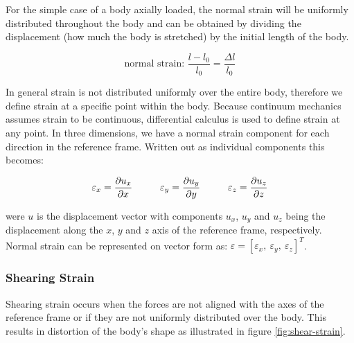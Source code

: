 For the simple case of a body axially loaded,
the normal strain will be uniformly distributed throughout the body
and can be obtained by dividing the displacement (how much the body is
stretched) by the initial length of the body.

\begin{equation}
\mbox{normal strain: } \frac{l-l_0}{l_0} = \frac{\Delta l}{l_0}
\end{equation}

In general strain is not distributed uniformly over the entire
body, therefore we define strain at a specific point within the
body. Because continuum mechanics assumes strain to be continuous,
differential calculus is used to define strain at any point.
In three dimensions, we have a normal strain component
for each direction in the reference frame. Written out as individual
components this becomes: 

\begin{equation}
\label{eq:individual-normal-strain}
\varepsilon_x = \frac{\partial u_x}{\partial x} \hspace{10 mm}
\varepsilon_y = \frac{\partial u_y}{\partial y} \hspace{10 mm}
\varepsilon_z = \frac{\partial u_z}{\partial z}
\end{equation}

were $u$ is the displacement vector with components $u_x$, $u_y$ and
$u_z$ being the displacement along the $x$, $y$ and $z$ axis of the
reference frame, respectively. Normal strain can be represented on
vector form as:
$\varepsilon = [ \varepsilon_x, \ \varepsilon_y, \ \varepsilon_z ]^T$.

\subsubsection{Shearing Strain}
Shearing strain occurs when the forces are not aligned with the axes
of the reference frame or if they are not uniformly distributed over
the body. This results in distortion of the body's shape as
illustrated in figure \vref{fig:shear-strain}.


